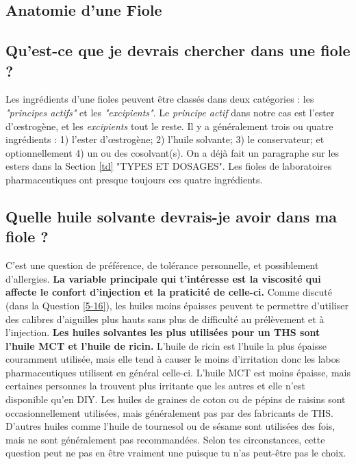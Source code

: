 \documentclass{article}
\begin{document}
\subsection*{Anatomie d'une Fiole}

\subsection{Qu'est-ce que je devrais chercher dans une fiole ?}

Les ingrédients d'une fioles peuvent être classés dans deux catégories : les \textit{"principes actifs"} et les \textit{"excipients"}. Le \textit{principe actif} dans notre cas est l'ester d'œstrogène, et les \textit{excipients} tout le reste. Il y a généralement trois ou quatre ingrédients : 1) l'ester d'œstrogène; 2) l'huile solvante; 3) le conservateur; et optionnellement 4) un ou des cosolvant(s). On a déjà fait un paragraphe sur les esters dans la Section \ref{td} "TYPES ET DOSAGES". Les fioles de laboratoires pharmaceutiques ont presque toujours ces quatre ingrédients.

\subsection{Quelle huile solvante devrais-je avoir dans ma fiole ?}\label{6-16}

C'est une question de préférence, de tolérance personnelle, et possiblement d'allergies. \textbf{La variable principale qui t'intéresse est la viscosité qui affecte le confort d'injection et la praticité de celle-ci.} Comme discuté (dans la Question \ref{5-16}), les huiles moins épaisses peuvent te permettre d'utiliser des calibres d'aiguilles plus hauts sans plus de difficulté au prélèvement et à l'injection. \textbf{Les huiles solvantes les plus utilisées pour un THS sont l'huile MCT et l'huile de ricin.} L'huile de ricin est l'huile la plus épaisse couramment utilisée, mais elle tend à causer le moins d'irritation donc les labos pharmaceutiques utilisent en général celle-ci. L'huile MCT est moins épaisse, mais certaines personnes la trouvent plus irritante que les autres et elle n'est disponible qu'en DIY. Les huiles de graines de coton ou de pépins de raisins sont occasionnellement utilisées, mais généralement pas par des fabricants de THS. D'autres huiles comme l'huile de tournesol ou de sésame sont utilisées des fois, mais ne sont généralement pas recommandées. Selon tes circonstances, cette question peut ne pas en être vraiment une puisque tu n'as peut-être pas le choix.
\end{document}
